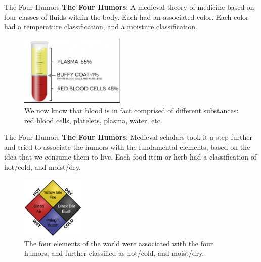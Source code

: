 \documentclass{beamer}
\begin{document}
\begin{frame}{The Four Humors}
\textbf{\alert{The Four Humors}}: A medieval theory of medicine based on four classes of fluids within the body.  Each had an associated color.  Each color had a temperature classification, and a moisture classification.
\begin{figure}
\centering
\includegraphics[width=5cm]{figures/blood2.jpg}
\caption{\label{fig:blood2} We now know that blood is in fact comprised of different substances: red blood cells, platelets, plasma, water, etc.}
\end{figure}
\end{frame}

\begin{frame}{The Four Humors}
\textbf{\alert{The Four Humors}}: Medieval scholars took it a step further and tried to associate the humors with the fundamental elements, based on the idea that we consume them to live.  Each food item or herb had a classification of hot/cold, and moist/dry.
\begin{figure}
\centering
\includegraphics[width=3cm]{figures/humors.png}
\caption{\label{fig:humors} The four elements of the world were associated with the four humors, and further classified as hot/cold, and moist/dry.}
\end{figure}
\end{frame}
\end{document}
